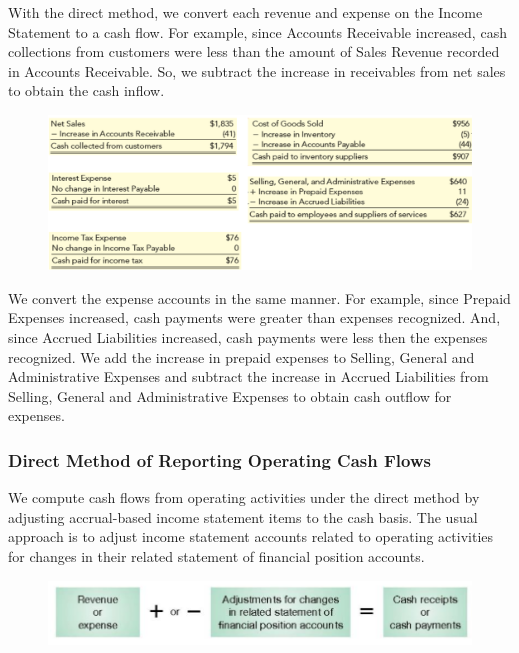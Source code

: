 \documentclass[../main.tex]{subfiles}
\begin{document}
	With the direct method, we convert each revenue and expense on the Income 
	Statement to a cash flow. For example, since Accounts Receivable increased, 
	cash collections from customers were less than the amount of Sales Revenue 
	recorded in Accounts Receivable. So, we subtract the increase in 
	receivables from net sales to obtain the cash inflow.
	
	\begin{figure}[ht!]
		\centering
		\includegraphics[width=1\columnwidth]{images/c11/direct_method_operating.png}
	\end{figure}
	
	We convert the expense accounts in the same manner. For example, since 
	Prepaid Expenses increased, cash payments were greater than expenses 
	recognized. And, since Accrued Liabilities increased, cash payments were 
	less then the expenses recognized. We add the increase in prepaid expenses 
	to Selling, General and Administrative Expenses and subtract the increase 
	in Accrued Liabilities from Selling, General and Administrative Expenses to 
	obtain cash outflow for expenses.
	
	\subsubsection{Direct Method of Reporting Operating Cash Flows}
	
	We compute cash flows from operating activities under the direct method by 
	adjusting accrual-based income statement items to the cash basis. The usual 
	approach is to adjust income statement accounts related to operating 
	activities for changes in their related statement of financial position 
	accounts.
	
	\begin{figure}[ht]
		\centering
		\includegraphics[width=1\columnwidth]{images/c11/direct_operating.png}
	\end{figure}
	
\end{document}
